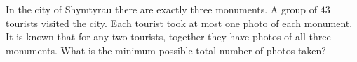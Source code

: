 In the city of Shymtyrau there are exactly three monuments. A group of $43$ tourists visited the city. Each tourist took at most one photo of each monument. It is known that for any two tourists, together they have photos of all three monuments. What is the minimum possible total number of photos taken?
